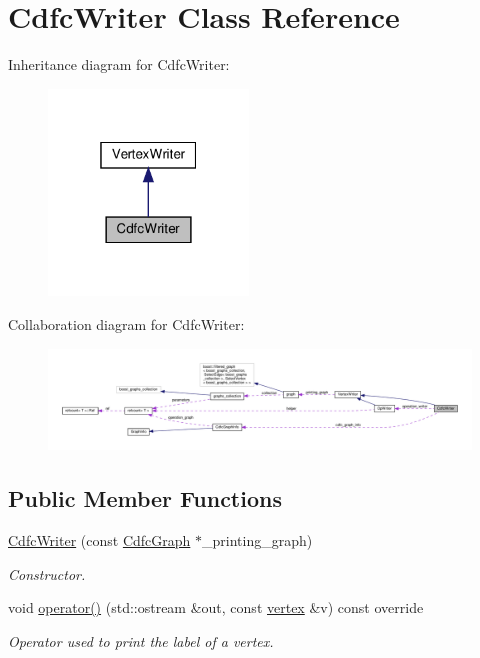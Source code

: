 \hypertarget{classCdfcWriter}{}\section{Cdfc\+Writer Class Reference}
\label{classCdfcWriter}


Inheritance diagram for Cdfc\+Writer\+:
\nopagebreak
\begin{figure}[H]
\begin{center}
\leavevmode
\includegraphics[width=151pt]{d5/dff/classCdfcWriter__inherit__graph}
\end{center}
\end{figure}


Collaboration diagram for Cdfc\+Writer\+:
\nopagebreak
\begin{figure}[H]
\begin{center}
\leavevmode
\includegraphics[width=350pt]{d4/d7e/classCdfcWriter__coll__graph}
\end{center}
\end{figure}
\subsection*{Public Member Functions}
\begin{DoxyCompactItemize}
\item 
\hyperlink{classCdfcWriter_a5335ee5a03a31f3f491583fafc9cf5a3}{Cdfc\+Writer} (const \hyperlink{classCdfcGraph}{Cdfc\+Graph} $\ast$\+\_\+printing\+\_\+graph)
\begin{DoxyCompactList}\small\item\em Constructor. \end{DoxyCompactList}\item 
void \hyperlink{classCdfcWriter_a8430da34044c0c57b7ccda0a2720dc04}{operator()} (std\+::ostream \&out, const \hyperlink{graph_8hpp_abefdcf0544e601805af44eca032cca14}{vertex} \&v) const override
\begin{DoxyCompactList}\small\item\em Operator used to print the label of a vertex. \end{DoxyCompactList}\end{DoxyCompactItemize}
